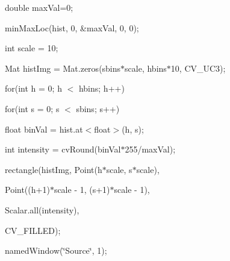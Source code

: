 {\ttfamily double max\+Val=0;}

{\ttfamily }

{\ttfamily }

{\ttfamily min\+Max\+Loc(hist, 0, \&max\+Val, 0, 0);}

{\ttfamily }

{\ttfamily }

{\ttfamily int scale = 10;}

{\ttfamily }

{\ttfamily }

{\ttfamily Mat hist\+Img = Mat.\+zeros(sbins$\ast$scale, hbins$\ast$10, C\+V\+\_\+U\+C3);}

{\ttfamily }

{\ttfamily }

{\ttfamily for(int h = 0; h $<$ hbins; h++)}

{\ttfamily }

{\ttfamily }

{\ttfamily for(int s = 0; s $<$ sbins; s++)}

{\ttfamily }

{\ttfamily }

{\ttfamily float bin\+Val = hist.\+at$<$float$>$(h, s);}

{\ttfamily }

{\ttfamily }

{\ttfamily int intensity = cv\+Round(bin\+Val$\ast$255/max\+Val);}

{\ttfamily }

{\ttfamily }

{\ttfamily rectangle(hist\+Img, Point(h$\ast$scale, s$\ast$scale),}

{\ttfamily }

{\ttfamily }

{\ttfamily Point((h+1)$\ast$scale -\/ 1, (s+1)$\ast$scale -\/ 1),}

{\ttfamily }

{\ttfamily }

{\ttfamily Scalar.\+all(intensity),}

{\ttfamily }

{\ttfamily }

{\ttfamily C\+V\+\_\+\+F\+I\+L\+L\+ED);}

{\ttfamily }

{\ttfamily }

{\ttfamily named\+Window(\char`\"{}\+Source\char`\"{}, 1);}

{\ttfamily }

{\ttfamily }

